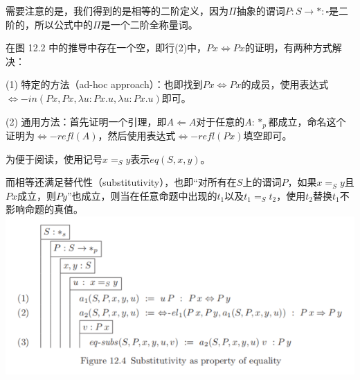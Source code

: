 \documentclass[UTF8]{article}
\begin{document}
		需要注意的是，我们得到的是相等的二阶定义，因为$\Pi$抽象的谓词$P:S\rightarrow*:\square$是二阶的，所以公式中的$\Pi$是一个二阶全称量词。
		
		在图 12.2 中的推导中存在一个空，即行(2)中，$Px\Leftrightarrow Px$的证明，有两种方式解决：
		
		(1) 特定的方法（ad-hoc approach）：也即找到$Px\Leftrightarrow Px$的成员，使用表达式$\Leftrightarrow{-in}(Px,Px,\lambda u:Px.u,\lambda u:Px.u)$即可。
		
		(2) 通用方法：首先证明一个引理，即$A\Leftarrow A$对于任意的$A:*_p$都成立，命名这个证明为$\Leftrightarrow{-refl}(A)$，然后使用表达式$\Leftrightarrow{-refl}(Px)$填空即可。
		
		为便于阅读，使用记号$x=_S y$表示$eq(S,x,y)$。
		
		而相等还满足替代性（substitutivity），也即“对所有在$S$上的谓词$P$，如果$x=_S y$且$Px$成立，则$Py$”也成立，则当在任意命题中出现的$t_1$以及$t_1=_S t_2$，使用$t_2$替换$t_1$不影响命题的真值。\\
		\includegraphics[width=0.93\linewidth]{"../imgs/12-4.png"}
\end{document}

